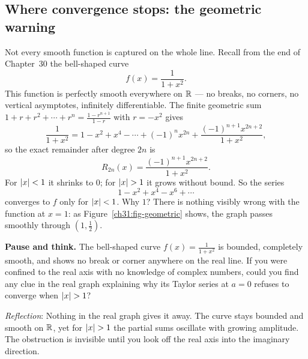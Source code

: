 \subsection{Where convergence stops: the geometric warning}

Not every smooth function is captured on the whole line. Recall from the end of
Chapter~30 the bell-shaped curve
\[
  f(x) = \frac{1}{1+x^2}.
\]
This function is perfectly smooth everywhere on $\mathbb{R}$ --- no breaks, no corners, no
vertical asymptotes, infinitely differentiable. The finite geometric sum
$1 + r + r^2 + \cdots + r^n = \frac{1 - r^{n+1}}{1-r}$ with $r = -x^2$ gives
\[
  \frac{1}{1+x^2} = 1 - x^2 + x^4 - \cdots + (-1)^n x^{2n} + \frac{(-1)^{n+1}x^{2n+2}}{1+x^2},
\]
so the exact remainder after degree $2n$ is
\[
  R_{2n}(x) = \frac{(-1)^{n+1}x^{2n+2}}{1+x^2}.
\]
For $\lvert x\rvert < 1$ it shrinks to $0$; for $\lvert x\rvert > 1$ it grows without bound. So the series
\[
  1 - x^2 + x^4 - x^6 + \cdots
\]
converges to $f$ only for $\lvert x\rvert < 1$. Why $1$? There
is nothing visibly wrong with the function at $x = 1$: as
Figure~\ref{ch31:fig-geometric} shows, the graph passes smoothly through
$(1, \tfrac12)$.

\begin{recoverybox}
\textbf{Pause and think.}
The bell-shaped curve $f(x) = \frac{1}{1+x^2}$ is bounded, completely smooth, and shows no
break or corner anywhere on the real line. If you were confined to the real axis with no
knowledge of complex numbers, could you find any clue in the real graph explaining why its
Taylor series at $a=0$ refuses to converge when $\lvert x\rvert > 1$?

\emph{Reflection}: Nothing in the real graph gives it away. The curve stays bounded and
smooth on $\mathbb{R}$, yet for $\lvert x\rvert > 1$ the partial sums oscillate with growing amplitude. The
obstruction is invisible until you look off the real axis into the imaginary direction.
\end{recoverybox}


